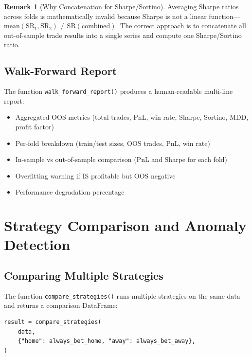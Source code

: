 \documentclass[12pt,a4paper]{report}
\theoremstyle{definition}
\newtheorem{remark}{Remark}[chapter]
\newcommand{\func}[1]{\texttt{#1()}}
\begin{document}
\begin{remark}[Why Concatenation for Sharpe/Sortino]
Averaging Sharpe ratios across folds is mathematically invalid because Sharpe is not a linear function—$\text{mean}(\text{SR}_1, \text{SR}_2) \neq \text{SR}(\text{combined})$. The correct approach is to concatenate all out-of-sample trade results into a single series and compute one Sharpe/Sortino ratio.
\end{remark}

\section{Walk-Forward Report}

The function \func{walk\_forward\_report} produces a human-readable multi-line report:
\begin{itemize}
    \item Aggregated OOS metrics (total trades, PnL, win rate, Sharpe, Sortino, MDD, profit factor)
    \item Per-fold breakdown (train/test sizes, OOS trades, PnL, win rate)
    \item In-sample vs out-of-sample comparison (PnL and Sharpe for each fold)
    \item Overfitting warning if IS profitable but OOS negative
    \item Performance degradation percentage
\end{itemize}


\chapter{Strategy Comparison and Anomaly Detection}
\label{ch:comparison}

\section{Comparing Multiple Strategies}

The function \func{compare\_strategies} runs multiple strategies on the same data and returns a comparison DataFrame:

\begin{lstlisting}[caption={Strategy comparison usage.}]
result = compare_strategies(
    data,
    {"home": always_bet_home, "away": always_bet_away},
)
\end{lstlisting}
\end{document}
